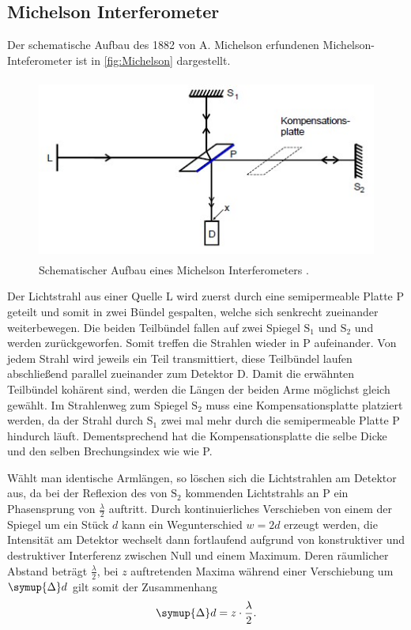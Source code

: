 \subsection{Michelson Interferometer}
\label{sec:Michelson Interferometer}

Der schematische Aufbau des 1882 von A. Michelson erfundenen Michelson-Inteferometer ist in
\autoref{fig:Michelson} dargestellt.

\begin{figure}[H]
    \centering
    \includegraphics[height=6cm]{content/pics/Michelson.jpg}
    \caption{Schematischer Aufbau eines Michelson Interferometers \cite{v401}.}
    \label{fig:Michelson}
\end{figure}

Der Lichtstrahl aus einer Quelle L wird zuerst durch eine semipermeable Platte P geteilt und somit in zwei Bündel gespalten,
welche sich senkrecht zueinander weiterbewegen.
Die beiden Teilbündel fallen auf zwei Spiegel $\text{S}_1$ und $\text{S}_2$ und werden zurückgeworfen.
Somit treffen die Strahlen wieder in P aufeinander.
Von jedem Strahl wird jeweils ein Teil transmittiert, diese Teilbündel laufen abschließend parallel zueinander zum
Detektor D.
Damit die erwähnten Teilbündel kohärent sind, werden die Längen der beiden Arme möglichst gleich gewählt.
Im Strahlenweg zum Spiegel $\text{S}_2$ muss eine Kompensationsplatte platziert werden, da der Strahl durch
$\text{S}_1$ zwei mal mehr durch die semipermeable Platte P hindurch läuft. Dementsprechend hat die Kompensationsplatte
die selbe Dicke und den selben Brechungsindex wie wie P.

Wählt man identische Armlängen, so löschen sich die Lichtstrahlen am Detektor aus, da bei der Reflexion des von
$\text{S}_2$ kommenden Lichtstrahls an P ein Phasensprung von $\frac{\lambda}{2}$ auftritt.
Durch kontinuierliches Verschieben von einem der Spiegel um ein Stück $d$ kann ein Wegunterschied $w=2d$ erzeugt werden,
die Intensität am Detektor wechselt dann fortlaufend aufgrund von konstruktiver und destruktiver Interferenz
zwischen Null und einem Maximum. Deren räumlicher Abstand beträgt $\frac{\lambda}{2}$, bei $z$ auftretenden
Maxima während einer Verschiebung um $\symup{\Delta}d$ gilt somit der Zusammenhang
\begin{equation}
    \label{eq:Lambda}
    \symup{\Delta}d=z \cdot \frac{\lambda}{2}.
\end{equation}

